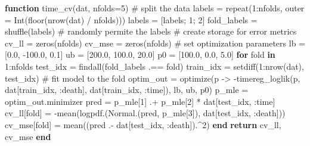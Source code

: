 \documentclass[
  letterpaper,
  DIV=11,
  numbers=noendperiod]{scrartcl}
\newenvironment{Shaded}{\begin{snugshade}}{\end{snugshade}}
\newcommand{\CommentTok}[1]{\textcolor[rgb]{0.37,0.37,0.37}{#1}}
\newcommand{\ControlFlowTok}[1]{\textcolor[rgb]{0.00,0.23,0.31}{\textbf{#1}}}
\newcommand{\FloatTok}[1]{\textcolor[rgb]{0.68,0.00,0.00}{#1}}
\newcommand{\FunctionTok}[1]{\textcolor[rgb]{0.28,0.35,0.67}{#1}}
\newcommand{\KeywordTok}[1]{\textcolor[rgb]{0.00,0.23,0.31}{\textbf{#1}}}
\newcommand{\NormalTok}[1]{\textcolor[rgb]{0.00,0.23,0.31}{#1}}
\newcommand{\OperatorTok}[1]{\textcolor[rgb]{0.37,0.37,0.37}{#1}}
\newcommand*\circled[1]{\tikz[baseline=(char.base)]{
          \node[shape=circle,draw,inner sep=1pt] (char) {{\scriptsize#1}};}}
\begin{document}
\label{annotated-cell-18}%
\begin{Shaded}
\begin{Highlighting}[]
\KeywordTok{function} \FunctionTok{time\_cv}\NormalTok{(dat, nfolds}\OperatorTok{=}\FloatTok{5}\NormalTok{)}
    \CommentTok{\# split the data}
\NormalTok{    labels }\OperatorTok{=} \FunctionTok{repeat}\NormalTok{(}\FloatTok{1}\OperatorTok{:}\NormalTok{nfolds, outer }\OperatorTok{=} \FunctionTok{Int}\NormalTok{(}\FunctionTok{floor}\NormalTok{(}\FunctionTok{nrow}\NormalTok{(dat) }\OperatorTok{/}\NormalTok{ nfolds))) }\hspace*{\fill}\NormalTok{\circled{1}}
\NormalTok{    labels }\OperatorTok{=}\NormalTok{ [labels; }\FloatTok{1}\NormalTok{; }\FloatTok{2}\NormalTok{] }
\NormalTok{    fold\_labels }\OperatorTok{=} \FunctionTok{shuffle}\NormalTok{(labels) }\CommentTok{\# randomly permite the labels}
    \CommentTok{\# create storage for error metrics}
\NormalTok{    cv\_ll }\OperatorTok{=} \FunctionTok{zeros}\NormalTok{(nfolds)}
\NormalTok{    cv\_mse }\OperatorTok{=} \FunctionTok{zeros}\NormalTok{(nfolds)}
    \CommentTok{\# set optimization parameters}
\NormalTok{    lb }\OperatorTok{=}\NormalTok{ [}\FloatTok{0.0}\NormalTok{, }\OperatorTok{{-}}\FloatTok{100.0}\NormalTok{, }\FloatTok{0.1}\NormalTok{]}
\NormalTok{    ub }\OperatorTok{=}\NormalTok{ [}\FloatTok{200.0}\NormalTok{, }\FloatTok{100.0}\NormalTok{, }\FloatTok{20.0}\NormalTok{]}
\NormalTok{    p0 }\OperatorTok{=}\NormalTok{ [}\FloatTok{100.0}\NormalTok{, }\FloatTok{0.0}\NormalTok{, }\FloatTok{5.0}\NormalTok{]}
    \ControlFlowTok{for}\NormalTok{ fold }\KeywordTok{in} \FloatTok{1}\OperatorTok{:}\NormalTok{nfolds}
\NormalTok{        test\_idx }\OperatorTok{=} \FunctionTok{findall}\NormalTok{(fold\_labels }\OperatorTok{.==}\NormalTok{ fold)}
\NormalTok{        train\_idx }\OperatorTok{=} \FunctionTok{setdiff}\NormalTok{(}\FloatTok{1}\OperatorTok{:}\FunctionTok{nrow}\NormalTok{(dat), test\_idx)}
        \CommentTok{\# fit model to the fold}
\NormalTok{        optim\_out }\OperatorTok{=} \FunctionTok{optimize}\NormalTok{(p }\OperatorTok{{-}\textgreater{}} \FunctionTok{{-}timereg\_loglik}\NormalTok{(p, dat[train\_idx, }\OperatorTok{:}\NormalTok{death], dat[train\_idx, }\OperatorTok{:}\NormalTok{time]), lb, ub, p0)}
\NormalTok{        p\_mle }\OperatorTok{=}\NormalTok{ optim\_out.minimizer}
\NormalTok{        pred }\OperatorTok{=}\NormalTok{ p\_mle[}\FloatTok{1}\NormalTok{] }\OperatorTok{.+}\NormalTok{ p\_mle[}\FloatTok{2}\NormalTok{] }\OperatorTok{*}\NormalTok{ dat[test\_idx, }\OperatorTok{:}\NormalTok{time]}
\NormalTok{        cv\_ll[fold] }\OperatorTok{=} \FunctionTok{{-}mean}\NormalTok{(}\FunctionTok{logpdf}\NormalTok{.(}\FunctionTok{Normal}\NormalTok{.(pred, p\_mle[}\FloatTok{3}\NormalTok{]), dat[test\_idx, }\OperatorTok{:}\NormalTok{death])) }\hspace*{\fill}\NormalTok{\circled{2}}
\NormalTok{        cv\_mse[fold] }\OperatorTok{=} \FunctionTok{mean}\NormalTok{((pred }\OperatorTok{.{-}}\NormalTok{ dat[test\_idx, }\OperatorTok{:}\NormalTok{death])}\OperatorTok{.\^{}}\FloatTok{2}\NormalTok{)}
    \ControlFlowTok{end}
    \ControlFlowTok{return}\NormalTok{ cv\_ll, cv\_mse}
\KeywordTok{end}


\end{Highlighting}
\end{Shaded}
\end{document}
